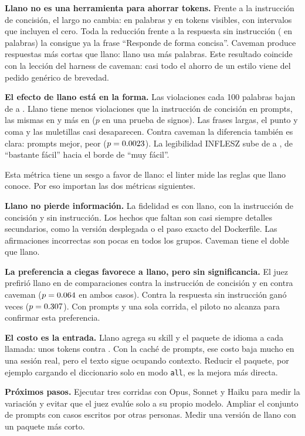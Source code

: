 \textbf{Llano no es una herramienta para ahorrar tokens.} Frente a la instrucción de concisión, el largo no cambia: \deltaWordsTerse{} en palabras y \deltaTokensTerse{} en tokens visibles, con intervalos que incluyen el cero. Toda la reducción frente a la respuesta sin instrucción (\deltaWordsBaseline{} en palabras) la consigue ya la frase ``Responde de forma concisa''. Caveman produce respuestas más cortas que llano: llano usa \deltaWordsCaveman{} más palabras. Este resultado coincide con la lección del harness de caveman: casi todo el ahorro de un estilo viene del pedido genérico de brevedad.

\textbf{El efecto de llano está en la forma.} Las violaciones cada 100 palabras bajan de \tersePerHundred{} a \llanoPerHundred. Llano tiene menos violaciones que la instrucción de concisión en \violBetterTerse{} prompts, las mismas en \violEqualTerse{} y más en \violWorseTerse{} ($p$ \violPTerse{} en una prueba de signos). Las frases largas, el punto y coma y las muletillas casi desaparecen. Contra caveman la diferencia también es clara: \violBetterCaveman{} prompts mejor, \violWorseCaveman{} peor ($p = 0.0023$). La legibilidad INFLESZ sube de \terseInflesz{} a \llanoInflesz{}, de ``bastante fácil'' hacia el borde de ``muy fácil''.

Esta métrica tiene un sesgo a favor de llano: el linter mide las reglas que llano conoce. Por eso importan las dos métricas siguientes.

\textbf{Llano no pierde información.} La fidelidad es \llanoFidelity{} con llano, \terseFidelity{} con la instrucción de concisión y \baselineFidelity{} sin instrucción. Los hechos que faltan son casi siempre detalles secundarios, como la versión desplegada o el paso exacto del Dockerfile. Las afirmaciones incorrectas son pocas en todos los grupos. Caveman tiene el doble que llano.

\textbf{La preferencia a ciegas favorece a llano, pero sin significancia.} El juez prefirió llano en \winsTerse{} de \evalPrompts{} comparaciones contra la instrucción de concisión y en \winsCaveman{} contra caveman ($p = 0.064$ en ambos casos). Contra la respuesta sin instrucción ganó \winsBaseline{} veces ($p = 0.307$). Con \evalPrompts{} prompts y una sola corrida, el piloto no alcanza para confirmar esta preferencia.

\textbf{El costo es la entrada.} Llano agrega su skill y el paquete de idioma a cada llamada: unos \llanoInputTokens{} tokens contra \terseInputTokens{}. Con la caché de prompts, ese costo baja mucho en una sesión real, pero el texto sigue ocupando contexto. Reducir el paquete, por ejemplo cargando el diccionario solo en modo \texttt{all}, es la mejora más directa.

\textbf{Próximos pasos.} Ejecutar tres corridas con Opus, Sonnet y Haiku para medir la variación y evitar que el juez evalúe solo a su propio modelo. Ampliar el conjunto de prompts con casos escritos por otras personas. Medir una versión de llano con un paquete más corto.

